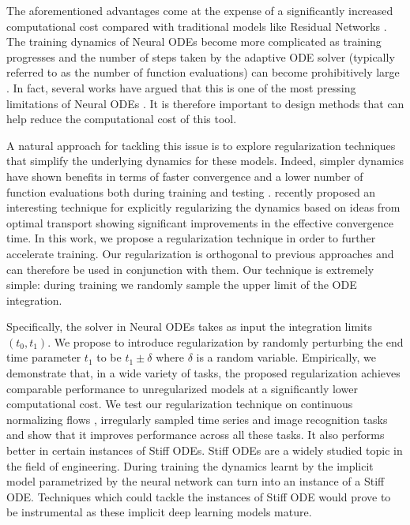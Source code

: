 The aforementioned advantages come at the expense of a significantly increased computational cost compared with traditional models like Residual Networks \cite{he2016deep}.
The training dynamics of Neural ODEs become more complicated as training progresses and the number of steps taken by the adaptive ODE solver (typically referred to as the number of function evaluations) can become prohibitively large \cite{dupont2019augmented}. In fact, several works have argued that this is one of the most pressing limitations of Neural ODEs \cite{chen2018neural, dupont2019augmented, finlay2020train}. It is therefore important to design methods that can help reduce the computational cost of this tool.

A natural approach for tackling this issue is to explore regularization techniques that simplify the underlying dynamics for these models. Indeed, simpler dynamics have shown benefits in terms of faster convergence and a lower number of function evaluations both during training and testing \cite{dupont2019augmented}.
\cite{finlay2020train} recently proposed an interesting technique for explicitly regularizing the dynamics based on ideas from optimal transport showing significant improvements in the effective convergence time.
In this work, we propose a regularization technique in order to further accelerate training. Our regularization is orthogonal to previous approaches and can therefore be used in conjunction with them. Our technique is extremely simple: during training we randomly sample the upper limit of the ODE integration.



Specifically, the solver in Neural ODEs takes as input the integration limits $(t_0,t_1)$.
We propose to introduce regularization by randomly perturbing the end time parameter $t_1$ to be $t_1\pm \delta$ where $\delta$ is a random variable.
Empirically, we demonstrate that, in a wide variety of tasks, the proposed regularization achieves comparable performance to unregularized models at a significantly lower computational cost. We test our regularization technique on continuous normalizing flows \cite{grathwohl2018ffjord}, irregularly sampled time series \cite{rubanova2019latent} and image recognition tasks and show that it improves performance across all these tasks. It also performs better in certain instances of Stiff ODEs. Stiff ODEs are a widely studied topic in the field of engineering\cite{curtiss1952integration}. During training the dynamics learnt by the implicit model parametrized by the neural network can turn into an instance of a Stiff ODE. Techniques which could tackle the instances of Stiff ODE would prove to be instrumental as these implicit deep learning models mature. 



